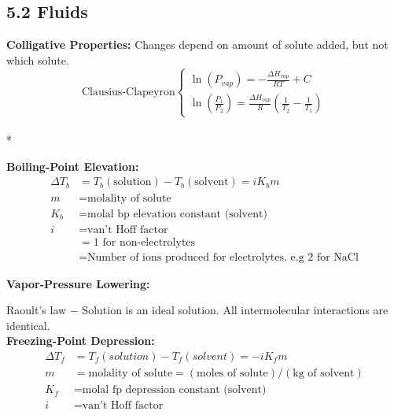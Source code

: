 \subsection{5.2 Fluids}
    \textbf{Colligative Properties: }Changes depend on amount of solute added, but not which solute.
    $$
    \text{Clausius-Clapeyron} \left\{
        \begin{array}{ll}
            \ln(P_{vap}) = - \frac{\Delta H_{vap}}{RT} + C\\
            \ln(\frac{P_1}{P_2}) = \frac{\Delta H_{vap}}{R} \left( \frac{1}{T_2} - \frac{1}{T_1} \right)
        \end{array}
        \right.
    $$\\*


    \textbf{Boiling-Point Elevation:}
    \begin{align*}
        \Delta T_b & = T_b (\textrm{solution}) - T_b (\textrm{solvent}) = iK_b m\\
        m & = \text{molality of solute}\\
        K_b & = \text{molal bp elevation constant (solvent)}\\
        i & = \text{van't Hoff factor}\\
        & = 1 \text{ for non-electrolytes}\\
        & = \text{Number of ions produced for electrolytes.\ e.g 2 for NaCl}
    \end{align*}
    
    \textbf{Vapor-Pressure Lowering: }
    
        Raoult's law $-$ Solution is an ideal solution. All intermolecular interactions are identical.\\

    \textbf{Freezing-Point Depression: }
        \begin{align*}
            \Delta T_f & = T_f (solution) - T_f (solvent) = -iK_{f}m\\
            m & = \text{molality of solute} = (\textrm{moles of solute}) / (\textrm{kg of solvent})\\
            K_f & = \text{molal fp depression constant (solvent)}\\
            i & = \text{van't Hoff factor}
        \end{align*}